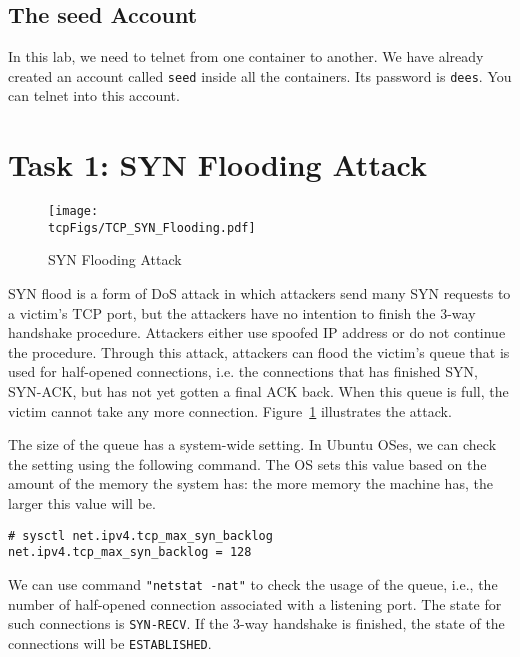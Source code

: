 \subsection{The seed Account} 

In this lab, we need to telnet from one container to another. 
We have already created an account called \texttt{seed} inside all
the containers.
Its password is \texttt{dees}. You can telnet into this account.  



\section{Task 1: SYN Flooding Attack}


\begin{figure}[htb]
  \begin{center}
    \texttt{[image: \\tcpFigs/TCP\_SYN\_Flooding.pdf]}
  \end{center}
  \caption{SYN Flooding Attack}
  \label{tcp:fig:synflooding}
\end{figure}
 


SYN flood is a form of DoS attack in which attackers send many SYN
requests to a victim's TCP port, but the attackers have no intention 
to finish the 3-way handshake procedure. Attackers either use spoofed 
IP address or do not continue the procedure. 
Through this attack, attackers can flood the victim's queue that is 
used for half-opened connections, i.e. the connections that has finished SYN, SYN-ACK, 
but has not yet gotten a final ACK back. When this queue is full, 
the victim cannot take any more connection. Figure~\ref{tcp:fig:synflooding}
illustrates the attack.

The size of the queue has a system-wide setting.  In Ubuntu OSes, we can check the
setting using the following command. The OS sets this value based on
the amount of the memory the system has: the more memory the machine has, 
the larger this value will be.

\begin{lstlisting}
# sysctl net.ipv4.tcp_max_syn_backlog
net.ipv4.tcp_max_syn_backlog = 128
\end{lstlisting}

We can use command \texttt{"netstat -nat"} to check the usage of the queue, 
i.e., the number of half-opened connection associated with a listening port. 
The state for such connections is \texttt {SYN-RECV}. If the 3-way handshake
is finished, the state of the connections will be {\tt ESTABLISHED}. 

